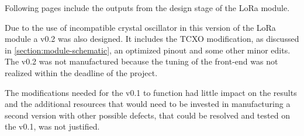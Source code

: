 
Following pages include the outputs from the design stage of the LoRa module.

Due to the use of incompatible crystal oscillator in this version of the LoRa module a v0.2 was also designed. It includes the TCXO modification, as discussed in \ref{section:module-schematic}, an optimized pinout and some other minor edits. The v0.2 was not manufactured because the tuning of the front-end was not realized within the deadline of the project. 

The modifications needed for the v0.1 to function had little impact on the results and the additional resources that would need to be invested in manufacturing a second version with other possible defects, that could be resolved and tested on the v0.1, was not justified.

